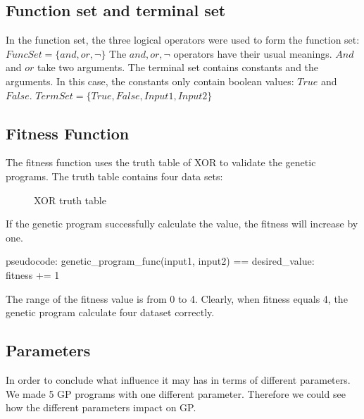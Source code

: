 \documentclass[11pt, a4paper, oneside, openright]{article}
\begin{document}
\subsection{Function set and terminal set}
In the function set, the three logical operators were used to form the function set:
\newline \hspace*{5cm} $FuncSet = \{and, or, \lnot\}$
\newline The $and, or, \lnot$ operators have their usual meanings. $And$ and $or$ take two arguments. 
The terminal set contains constants and the arguments. In this case, the constants only contain boolean values: $True$ and $False$.
 \newline \hspace*{5cm} $TermSet = \{True, False, Input1, Input2\}$
\subsection{Fitness Function}
The fitness function uses the truth table of XOR to validate the genetic programs. The truth table contains four data sets:
  \begin{figure}[!ht]
  \centerline{}
  \caption{XOR truth table}
  \label{fig:xortruth}
  \end{figure}
\newline If the genetic program successfully calculate the value, the fitness will increase by one. 

\begin{program}
\mbox{pseudocode:}
\hspace *{4cm} \IF genetic\_program\_func(input1, input2) == desired\_value:
 \\%
	fitness += 1
\end{program}
The range of the fitness value is from 0 to 4. Clearly, when fitness equals 4, the genetic program calculate four dataset correctly.

\subsection{Parameters}
In order to conclude what influence it may has in terms of different parameters. We made 5 GP programs with one different parameter. Therefore we could see how the different parameters impact on GP.
\end{document}
